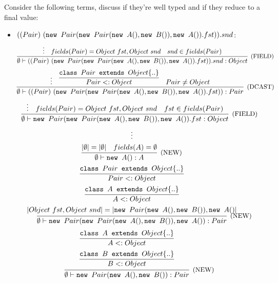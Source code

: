 \subsection{}

Consider the following terms, discuss if they're well typed and if they reduce to a final value:
\begin{itemize}
	\item $((Pair)\ (\texttt{new } Pair(\texttt{new } Pair(\texttt{new } A(), \texttt{new } B()), \texttt{new } A()).fst)).snd$:
	      \[
		      \infer[\text{\small{(FIELD)}}]
		      { \emptyset \vdash ((Pair)\ (\NEW Pair(\NEW Pair(\NEW A(), \NEW B()), \NEW A()).fst)).snd: Object }
		      {
			      \vdots &
			      fields(Pair) = Object\ fst, Object\ snd &
			      snd \in fields(Pair)
		      }
	      \]
	      \[
		      \infer[\text{\small{(DCAST)}}]
		      { \emptyset \vdash ((Pair)\ (\NEW Pair(\NEW Pair(\NEW A(), \NEW B()), \NEW A()).fst)): Pair }
		      {
			      \vdots &
			      \infer{ Pair <: Object }{ \texttt{class }Pair\texttt{ extends }Object\{..\} } &
			      Pair \ne Object
		      }
	      \]
	      \[
		      \infer[\text{\small{(FIELD)}}]
		      { \emptyset \vdash \NEW Pair(\NEW Pair(\NEW A(), \NEW B()), \NEW A()).fst: Object }
		      {
			      \vdots &
			      fields(Pair) = Object\ fst, Object\ snd &
			      fst \in fields(Pair)
		      }
	      \]
	      \[
		      \infer[\text{\small{(NEW)}}]
		      { \emptyset \vdash \NEW Pair(\NEW Pair(\NEW A(), \NEW B()), \NEW A()): Pair }
		      {
			      \begin{gathered}
				      \vdots \\
				      \infer[\text{\small{(NEW)}}]
				      { \emptyset \vdash \NEW A(): A }
				      {
					      |\emptyset| = |\emptyset| &
					      fields(A) = \emptyset
				      } \\
				      \infer{ Pair <: Object }{ \texttt{class }Pair\texttt{ extends }Object\{..\} } \\
				      \infer{ A <: Object }{ \texttt{class }A\texttt{ extends }Object\{..\} } \\
				      |Object\ fst, Object\ snd| = |\NEW Pair(\NEW A(), \NEW B()), \NEW A()|
			      \end{gathered}
		      }
	      \]
	      \[
		      \infer[\text{\small{(NEW)}}]
		      { \emptyset \vdash \NEW Pair(\NEW A(), \NEW B()): Pair }
		      {
			      \begin{gathered}
				      \infer{ A <: Object }{ \texttt{class }A\texttt{ extends }Object\{..\} } \\
				      \infer{ B <: Object }{ \texttt{class }B\texttt{ extends }Object\{..\} } \\

\end{gathered}}\]
\end{itemize}
